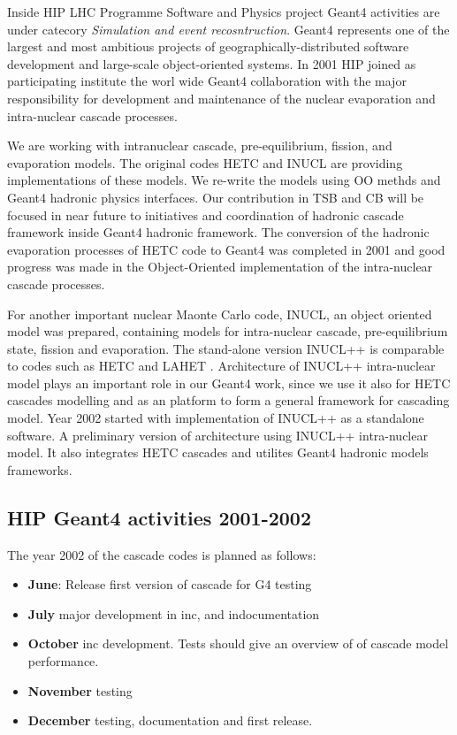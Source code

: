 Inside HIP LHC Programme Software and Physics project Geant4 activities are under catecory {\it Simulation and event recosntruction}.
Geant4 represents one of the largest and most ambitious projects of geographically-distributed software development and large-scale object-oriented systems.
In 2001 HIP joined as participating institute the worl wide Geant4 collaboration with the major responsibility for development and maintenance of the nuclear evaporation and intra-nuclear cascade processes. 


We are working with intranuclear cascade, pre-equilibrium, fission, and evaporation models. The original codes HETC and INUCL are providing implementations of these models. We re-write the models using OO methds and {\sc Geant4} hadronic physics interfaces.
Our contribution in TSB and CB will be focused in near future to initiatives and coordination of  hadronic cascade framework inside Geant4 hadronic framework.
The conversion of the hadronic evaporation processes of HETC code to Geant4 was completed in 2001 and good progress was made in the Object-Oriented implementation of the intra-nuclear cascade processes.


For another important nuclear Maonte Carlo code, INUCL, an object oriented model was prepared, containing models for intra-nuclear cascade, pre-equilibrium state, fission and evaporation. 
The stand-alone version INUCL++ is comparable to codes such as HETC and LAHET \cite{titarenko99}. 
Architecture of INUCL++ intra-nuclear model plays an important role in our Geant4 work, since we use it also for HETC cascades modelling and as an platform to form a general framework for cascading model.
Year 2002 started with implementation of  INUCL++ as a standalone software.
A preliminary version of architecture using INUCL++ intra-nuclear model. It also integrates HETC cascades and utilites Geant4 hadronic models frameworks.


\subsection{HIP Geant4 activities 2001-2002 }


The year 2002 of the cascade codes is planned as follows:
\begin{itemize}
\item {\bf June}: Release first version of cascade for G4 testing 
\item {\bf July} major development in inc, and indocumentation 
\item {\bf October} inc development. Tests should give an overview of of cascade model performance. 
\item {\bf November} testing 
\item {\bf December} testing, documentation and first release.
\end{itemize}

